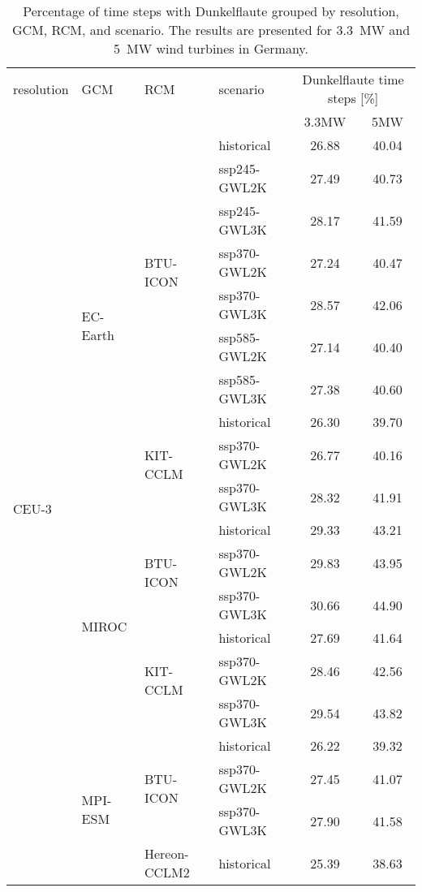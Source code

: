 \begin{table}[!htbp]
\centering
\caption{Percentage of time steps with Dunkelflaute grouped by resolution, GCM, RCM, and scenario. The results are presented for \qty{3.3}{\mega\watt} and \qty{5}{\mega\watt} wind turbines in Germany.}
\label{Table:Dunkelflaute_changes}
\begin{tabular}{lll|l|cc}
\toprule
resolution & GCM & RCM & scenario & \multicolumn{2}{c}{Dunkelflaute time steps [\%]} \\
 & & & & 3.3\si{\mega\watt} & 5\si{\mega\watt}  \\
\midrule
\multirow{22}{*}{CEU-3} & \multirow{10}{*}{EC-Earth} & \multirow{7}{*}{BTU-ICON} & historical & 26.88 & 40.04 \\
 &  &  & ssp245-GWL2K & 27.49 & 40.73 \\
 &  &  & ssp245-GWL3K & 28.17 & 41.59 \\
 &  &  & ssp370-GWL2K & 27.24 & 40.47 \\
 &  &  & ssp370-GWL3K & 28.57 & 42.06 \\
 &  &  & ssp585-GWL2K & 27.14 & 40.40 \\
 &  &  & ssp585-GWL3K & 27.38 & 40.60 \\
\cmidrule(lr){3-6}
 &  & \multirow{3}{*}{KIT-CCLM} & historical & 26.30 & 39.70 \\
 &  &  & ssp370-GWL2K & 26.77 & 40.16 \\
 &  &  & ssp370-GWL3K & 28.32 & 41.91 \\
\cmidrule(lr){3-6}
\cmidrule(lr){2-6}
 & \multirow{6}{*}{MIROC} & \multirow{3}{*}{BTU-ICON} & historical & 29.33 & 43.21 \\
 &  &  & ssp370-GWL2K & 29.83 & 43.95 \\
 &  &  & ssp370-GWL3K & 30.66 & 44.90 \\
\cmidrule(lr){3-6}
 &  & \multirow{3}{*}{KIT-CCLM} & historical & 27.69 & 41.64 \\
 &  &  & ssp370-GWL2K & 28.46 & 42.56 \\
 &  &  & ssp370-GWL3K & 29.54 & 43.82 \\
\cmidrule(lr){3-6}
\cmidrule(lr){2-6}
 & \multirow{6}{*}{MPI-ESM} & \multirow{3}{*}{BTU-ICON} & historical & 26.22 & 39.32 \\
 &  &  & ssp370-GWL2K & 27.45 & 41.07 \\
 &  &  & ssp370-GWL3K & 27.90 & 41.58 \\
\cmidrule(lr){3-6}
 &  & \multirow{3}{*}{Hereon-CCLM2} & historical & 25.39 & 38.63 \\

\end{tabular}
\end{table}

